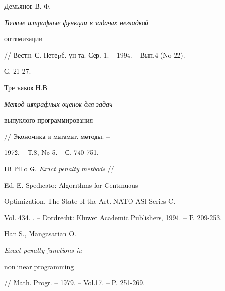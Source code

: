 

Демьянов В. Ф. {\it Точные штрафные функции в задачах негладкой


оптимизации} // Вестн. С.-Петеpб. ун-та. Сер. 1. -- 1994. -- Вып.4 (No 22). --


С. 21-27.





 Третьяков Н.В. {\it Метод штрафных оценок для задач


выпуклого программирования} // Экономика и математ. методы. --


1972. -- Т.8, No 5. -- С. 740-751.





 Di Pillo G. {\it Exact penalty methods} //


Ed. E. Spedicato: Algorithms for Continuous


Optimization. The State-of-the-Art. NATO ASI Series C.


Vol. 434. . -- Dordrecht: Kluwer Academic Publishers, 1994. -- P. 209-253.





 Han S., Mangasarian O. {\it Exact penalty functions in


nonlinear programming} // Math. Progr. -- 1979. -- Vol.17. -- P. 251-269.





